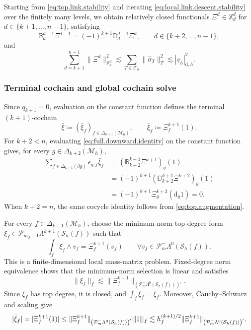 \documentclass[a4paper,11pt]{article}
\theoremstyle{definition}
\newcommand{\DIFF}{\mathrm{d}}
\newcommand{\Mh}{\mathcal{M}_h}
\newcommand{\Sh}{\mathcal{S}_h}
\newcommand{\FM}[1]{\Delta_{#1}}
\newcommand{\PLtrim}[2]{\mathcal{P}_{#1}^{-}\Lambda^{#2}}
\newcommand{\vvvert}{\vert\kern-0.25ex\vert\kern-0.25ex\vert}
\begin{document}
Starting from \eqref{eq:top.link.stability} and iterating \eqref{eq:local.link.descent.stability} over the finitely many levels, we obtain relatively closed functionals $\Xi^d\in\mathbb X_d^d$ for $d\in \{k+1,\ldots,n-1\}$, satisfying
\begin{equation}\label{eq:full.downward.identity}
  \mathbb B_d^{d-1}\Xi^{d-1}
  =
  (-1)^{k+1}\mathbb D_d^{d-1}\Xi^d,
  \qquad
  d \in \{k+2,\ldots,n-1\},
\end{equation}
and
\[
  \sum_{d=k+1}^{n-1}
  \|\Xi^d\|_{\mathbb X_d^d}^2
  \lesssim
  \sum_{T\in\mathcal T_h}
  \|\widehat\sigma_T\|_T^2
  \lesssim
  |\underline v_h|_{\DIFF,h}^2.
\]

\subsubsection{Terminal cochain and global cochain solve}
\label{subsubsec:terminal.cochain}

Since $q_{k+1}=0$, evaluation on the constant function defines the terminal $(k+1)$-cochain
\[
  \bar\xi
  \coloneqq
  (\bar\xi_f)_{f\in\FM{k+1}(\Mh)},
  \qquad
  \bar\xi_f
  \coloneqq
  \Xi_f^{k+1}(1).
\]
For $k+2<n$, evaluating \eqref{eq:full.downward.identity} on the constant function gives, for every $g\in\FM{k+2}(\Mh)$,
\[
\begin{aligned}
  \sum_{f\in\FM{k+1}(\partial g)}
  \epsilon_{g,f}\bar\xi_f
  &=
  \left(
    \mathbb B_{k+2}^{k+1}\Xi^{k+1}
  \right)_g(1)
  \\
  &=
  (-1)^{k+1}
  \left(
    \mathbb D_{k+2}^{k+1}\Xi^{k+2}
  \right)_g(1)
  \\
  &=
  (-1)^{k+1}\Xi_g^{k+2}(\DIFF_g1)
  =
  0.
\end{aligned}
\]
When $k+2=n$, the same cocycle identity follows from \eqref{eq:top.augmentation}.

For every $f\in\FM{k+1}(\Mh)$, choose the minimum-norm top-degree form $\xi_f\in\PLtrim{m_{\mathcal S}-1}{k+1}(\Sh(f))$ such that
\[
  \int_f\xi_f\wedge v_f
  =
  \Xi_f^{k+1}(v_f)
  \qquad
  \forall v_f\in\PLtrim{m}{0}(\Sh(f)).
\]
This is a finite-dimensional local mass-matrix problem.
Fixed-degree norm equivalence shows that the minimum-norm selection is linear and satisfies
\begin{equation}\label{eq:terminal.realisation.stability}
  \|\xi_f\|_f
  \lesssim
  \|\Xi_f^{k+1}\|_{\left(\PLtrim{m}{0}(\Sh(f))\right)'}.
\end{equation}
Since $\xi_f$ has top degree, it is closed, and $\int_f\xi_f=\bar\xi_f$.
Moreover, Cauchy--Schwarz and scaling give
\begin{equation}\label{eq:terminal.cochain.datum.stability}
  |\bar\xi_f|
  =
  |\Xi_f^{k+1}(1)|
  \leq
  \|\Xi_f^{k+1}\|_{\left(\PLtrim{m}{0}(\Sh(f))\right)'}
  \vvvert1\vvvert_f
  \lesssim
  h_f^{(k+1)/2}
  \|\Xi_f^{k+1}\|_{\left(\PLtrim{m}{0}(\Sh(f))\right)'}.
\end{equation}
\end{document}
